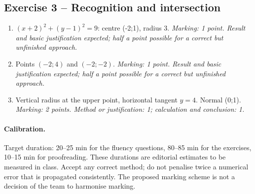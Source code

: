 \subsection*{Exercise 3 -- Recognition and intersection}
\begin{enumerate}
\item $(x+2)^2+(y-1)^2=9$: centre (-2;1), radius 3. \textit{Marking: 1 point. Result and basic justification expected; half a point possible for a correct but unfinished approach.}
\item Points $(-2;4)$ and $(-2;-2)$. \textit{Marking: 1 point. Result and basic justification expected; half a point possible for a correct but unfinished approach.}
\item Vertical radius at the upper point, horizontal tangent $y=4$. Normal (0;1). \textit{Marking: 2 points. Method or justification: 1; calculation and conclusion: 1.}
\end{enumerate}
\paragraph{Calibration.} Target duration: 20--25 min for the fluency questions, 80--85 min for the exercises, 10--15 min for proofreading. These durations are editorial estimates to be measured in class. Accept any correct method; do not penalise twice a numerical error that is propagated consistently. The proposed marking scheme is not a decision of the team to harmonise marking.
